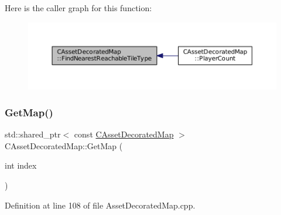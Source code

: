 Here is the caller graph for this function\+:\nopagebreak
\begin{figure}[H]
\begin{center}
\leavevmode
\includegraphics[width=350pt]{classCAssetDecoratedMap_a9e9eed95b427443d196b56b852cdeb9d_icgraph}
\end{center}
\end{figure}
\hypertarget{classCAssetDecoratedMap_afafb067884070fe0340f8b7e63bdc099}{}\label{classCAssetDecoratedMap_afafb067884070fe0340f8b7e63bdc099} 
\subsubsection{\texorpdfstring{Get\+Map()}{GetMap()}}
{\footnotesize\ttfamily std\+::shared\+\_\+ptr$<$ const \hyperlink{classCAssetDecoratedMap}{C\+Asset\+Decorated\+Map} $>$ C\+Asset\+Decorated\+Map\+::\+Get\+Map (\begin{DoxyParamCaption}\item[{int}]{index }\end{DoxyParamCaption})\hspace{0.3cm}{\ttfamily [static]}}



Definition at line 108 of file Asset\+Decorated\+Map.\+cpp.


